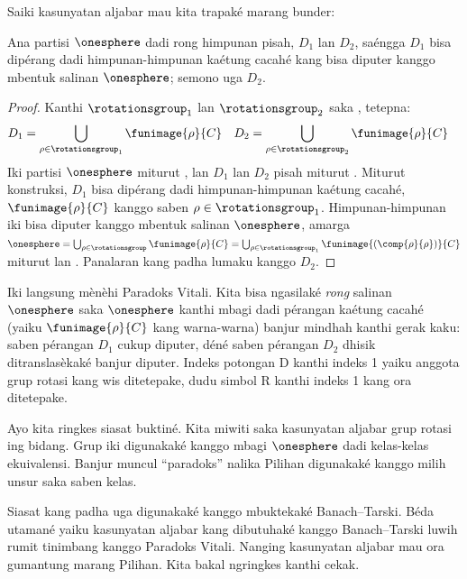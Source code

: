 \documentclass[../../../include/open-logic-section]{subfiles}
\begin{document}
Saiki kasunyatan aljabar mau kita trapaké marang bunder:

\begin{lem}
Ana partisi $\onesphere$ dadi rong himpunan pisah, $D_{1}$
lan $D_{2}$, saéngga $D_{1}$ bisa dipérang dadi himpunan-himpunan
kaétung cacahé kang bisa diputer kanggo mbentuk salinan
$\onesphere$; semono uga $D_{2}$.
\end{lem}

\begin{proof}
Kanthi $\rotationsgroup_{1}$ lan $\rotationsgroup_{2}$ saka
, tetepna:
\begin{align*}
	D_{1} &= \bigcup_{\rho \in \rotationsgroup_1} \funimage{\rho}{C} &
	D_{2} &= \bigcup_{\rho \in \rotationsgroup_2} \funimage{\rho}{C}
\end{align*}
Iki partisi $\onesphere$ miturut , lan $D_1$
lan $D_2$ pisah miturut . Miturut konstruksi,
$D_1$ bisa dipérang dadi himpunan-himpunan kaétung cacahé,
$\funimage{\rho}{C}$ kanggo saben $\rho \in \rotationsgroup_1$.
Himpunan-himpunan iki bisa diputer kanggo mbentuk salinan
$\onesphere$, amarga $\onesphere = \bigcup_{\rho \in
\rotationsgroup}\funimage{\rho}{C} = \bigcup_{\rho \in
\rotationsgroup_1}\funimage{(\comp{\rho}{\rho})}{C}$ miturut
 lan . Panalaran kang
padha lumaku kanggo $D_2$. \end{proof}\noindent Iki langsung
mènèhi Paradoks Vitali. Kita bisa ngasilaké \emph{rong} salinan
$\onesphere$ saka $\onesphere$ kanthi mbagi dadi pérangan kaétung
cacahé (yaiku $\funimage{\rho}{C}$ kang warna-warna) banjur
mindhah kanthi gerak kaku: saben pérangan $D_1$ cukup diputer,
déné saben pérangan $D_2$ dhisik ditranslasèkaké banjur diputer.
Indeks potongan D kanthi indeks 1 yaiku anggota grup rotasi kang wis ditetepake, dudu simbol R kanthi indeks 1 kang ora ditetepake.

Ayo kita ringkes siasat buktiné. Kita miwiti saka kasunyatan aljabar
grup rotasi ing bidang. Grup iki digunakaké kanggo mbagi
$\onesphere$ dadi kelas-kelas ekuivalensi. Banjur muncul
``paradoks'' nalika Pilihan digunakaké kanggo milih unsur saka
saben kelas.

Siasat kang padha uga digunakaké kanggo mbuktekaké Banach--Tarski.
Béda utamané yaiku kasunyatan aljabar kang dibutuhaké kanggo
Banach--Tarski luwih rumit tinimbang kanggo Paradoks Vitali.
Nanging kasunyatan aljabar mau ora gumantung marang Pilihan.
Kita bakal ngringkes kanthi cekak.
\end{document}
